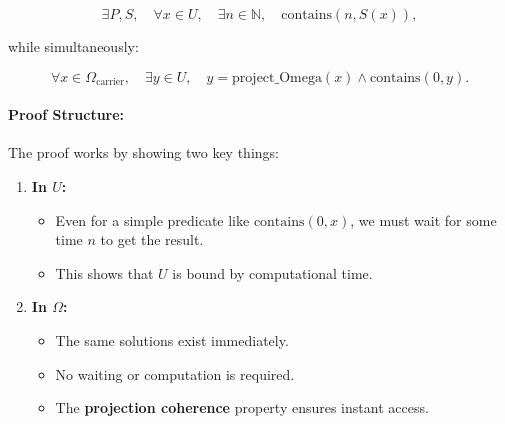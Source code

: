 \documentclass[12pt]{article}
\begin{document}
\begin{equation}
    \exists P, S, \quad \forall x \in U, \quad \exists n \in \mathbb{N}, \quad \text{contains}(n, S(x)),
\end{equation}

while simultaneously:

\begin{equation}
    \forall x \in \Omega_{\text{carrier}}, \quad \exists y \in U, \quad y = \text{project\_Omega}(x) \wedge \text{contains}(0, y).
\end{equation}

\paragraph{Proof Structure:}
The proof works by showing two key things:

\begin{enumerate}
    \item \textbf{In \( U \):}
    \begin{itemize}
        \item Even for a simple predicate like \( \text{contains}(0, x) \), we must wait for some time \( n \) to get the result.
        \item This shows that \( U \) is bound by computational time.
    \end{itemize}
    \item \textbf{In \( \Omega \):}
    \begin{itemize}
        \item The same solutions exist immediately.
        \item No waiting or computation is required.
        \item The \textbf{projection coherence} property ensures instant access.
    \end{itemize}
\end{enumerate}
\end{document}
